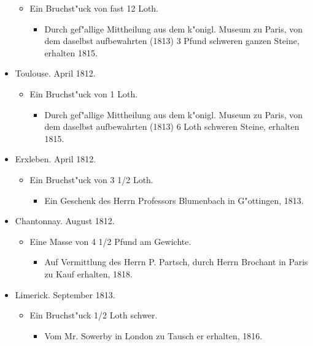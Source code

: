 \documentclass[a4paper, 11pt, oneside, polutonikogreek, german]{article}
\begin{document}
\begin{itemize}
    \begin{itemize}
        \item Ein Bruchst"uck von fast 12 Loth.
        \begin{itemize}
            \item Durch gef"allige Mittheilung aus dem k"onigl. Museum zu Paris, von dem daselbst aufbewahrten (1813) 3 Pfund schweren ganzen Steine, erhalten 1815.
        \end{itemize}
    \end{itemize}
    \item Toulouse. April 1812.
    \begin{itemize}
        \item Ein Bruchst"uck von 1 Loth.
        \begin{itemize}
            \item Durch gef"allige Mittheilung aus dem k"onigl. Museum zu Paris, von dem daselbst aufbewahrten (1813) 6 Loth schweren Steine, erhalten 1815.
        \end{itemize}
    \end{itemize}
    \item Erxleben. April 1812.
    \begin{itemize}
        \item Ein Bruchst"uck von 3 1/2 Loth.
        \begin{itemize}
            \item Ein Geschenk des Herrn Professors Blumenbach in G"ottingen, 1813.
        \end{itemize}
    \end{itemize}
    \item Chantonnay. August 1812.
    \begin{itemize}
        \item Eine Masse von 4 1/2 Pfund am Gewichte.
        \begin{itemize}
            \item Auf Vermittlung des Herrn P. Partsch, durch Herrn Brochant in Paris zu Kauf erhalten, 1818.
        \end{itemize}
    \end{itemize}
    \item Limerick. September 1813.
    \begin{itemize}
        \item Ein Bruchst"uck 1/2 Loth schwer.
        \begin{itemize}
            \item Vom Mr. Sowerby in London zu Tausch er erhalten, 1816.

\end{itemize}
\end{itemize}
\end{itemize}
\end{document}
